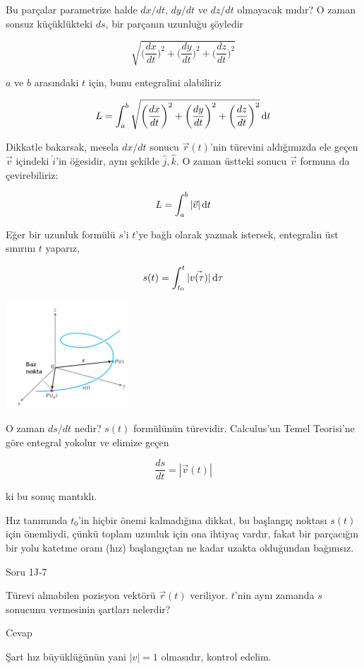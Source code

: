 \documentclass[12pt,fleqn]{article}\usepackage{../../common}
\begin{document}
Bu parçalar parametrize halde $dx/dt$, $dy/dt$ ve $dz/dt$ olmayacak mıdır?
O zaman sonsuz küçüklükteki $ds$, bir parçanın uzunluğu şöyledir

$$ \sqrt{ 
\bigg(\frac{dx}{dt}\bigg)^2 + 
\bigg(\frac{dy}{dt}\bigg)^2 + 
\bigg(\frac{dz}{dt}\bigg)^2 }
$$

$a$ ve $b$ arasındaki $t$ için, bunu entegralini alabiliriz

$$ L = \int_a^b \sqrt{ 
\bigg(\frac{dx}{dt}\bigg)^2 + 
\bigg(\frac{dy}{dt}\bigg)^2 + 
\bigg(\frac{dz}{dt}\bigg)^2 
} \,\mathrm{d} t $$

Dikkatle bakarsak, mesela $dx/dt$ sonucu $\vec{r}(t)$'nin türevini
aldığımızda ele geçen $\vec{v}$ içindeki $\hat{i}$'in öğesidir, aynı
şekilde $\hat{j},\hat{k}$. O zaman üstteki sonucu $\vec{v}$ formuna da
çevirebiliriz: 

$$ L = \int_a^b |\vec{v}| \,\mathrm{d} t $$

Eğer bir uzunluk formülü $s$'i $t$'ye bağlı olarak yazmak istersek,
entegralin üst sınırını $t$ yaparız,

$$ s(t) = \int_{t_0}^t |\vec{v(\tau)}| \,\mathrm{d}\tau  $$

\includegraphics[height=4cm]{6_9.png}

O zaman $ds/dt$ nedir? $s(t)$ formülünün türevidir. Calculus'un Temel
Teorisi'ne göre entegral yokolur ve elimize geçen

$$ \frac{ds}{dt} = |\vec{v}(t)|$$

ki bu sonuç mantıklı. 

Hız tanımında $t_0$'in hiçbir önemi kalmadığına dikkat, bu başlangıç noktası
$s(t)$ için önemliydi, çünkü toplam uzunluk için ona ihtiyaç vardır, fakat bir
parçacığın bir yolu katetme oranı (hız) başlangıçtan ne kadar uzakta olduğundan
bağımsız.

Soru 1J-7

Türevi alınabilen pozisyon vektörü $\vec{r}(t)$ veriliyor. $t$'nin aynı zamanda
$s$ sonucunu vermesinin şartları nelerdir?

Cevap

Şart hız büyüklüğünün yani $|v|=1$ olmasıdır, kontrol edelim. 
\end{document}
